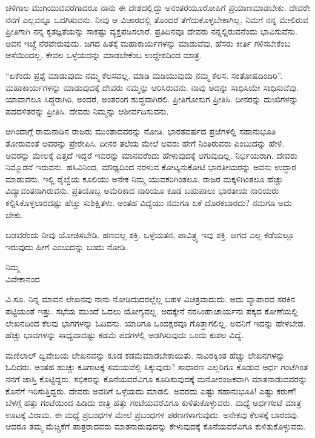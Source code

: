ಚಳಿಗಾಲ ಮುಗಿಯುವವರೆಗಾದರೂ ನಾನು ಈ ದೇಶದಲ್ಲಿದ್ದು ಅನಂತರ\break ಯೂರೋಪಿಗೆ ಪ್ರಯಾಣಮಾಡಬೇಕು. ದೇವರೇ ನನಗೆ ಎಲ್ಲವನ್ನೂ ಒದಗಿಸುವನು. ನೀವು ಆ ವಿಚಾರದಲ್ಲಿ ತೊಂದರೆ ತೆಗೆದುಕೊಳ್ಳಬೇಕಾಗಿಲ್ಲ. ನಿಮಗೆ ನನ್ನ ಮೇಲಿರುವ ಪ್ರೀತಿಗಾಗಿ ನನ್ನ ಕೃತಜ್ಞತೆಯನ್ನು ಸಾಕಷ್ಟು ವ್ಯಕ್ತಪಡಿಸಲಾರೆ. ಪ್ರತಿದಿನವೂ ದೇವರು ನನ್ನಲ್ಲಿರುವನೆಂದು ಭಾವಿಸುವೆನು. ಅವನ ಇಚ್ಚೆ ನೆರವೇರುವುದು. ಜಗದ ಹಿತಕ್ಕೆ ಮಹಾಕಾರ್ಯಗಳನ್ನು ಮಾಡುವೆವು, ಹೆಸರು ಕೀರ್ತಿ ಗಳಿಸಬೇಕೆಂಬ ಆಸೆಯಿಂದಲ್ಲ, ಕೇವಲ ಒಳ್ಳೆಯದನ್ನು ಮಾಡಬೇಕೆಂಬ ಉದ್ದೇಶದಿಂದ ಮಾತ್ರ.

“ಏಕೆಂದು ಪ್ರಶ್ನೆ ಮಾಡುವುದು ನಮ್ಮ ಕೆಲಸವಲ್ಲ. ಮಾಡಿ ಮಡಿಯುವುದು ನಮ್ಮ ಕೆಲಸ. ಸಂತೋಷದಿಂದಿರಿ”. ಮಹಾಕಾರ್ಯಗಳನ್ನು ಮಾಡುವುದಕ್ಕೆ ದೇವರು ನಮ್ಮನ್ನು ಆರಿಸಿರುವನು. ನಾವು ಅದನ್ನು ಸಾಧಿಸಿಯೇ ಸಾಧಿಸುವೆವು. ಯಾವಾಗಲೂ ಸಿದ್ಧರಾಗಿರಿ, ಅಂದರೆ, ಅಂತರಂಗ ಶುದ್ಧವಾಗಿರಲಿ. ಪ್ರೀತಿಗೋಸುಗ ಪ್ರೀತಿಸಿ. ದೀನರನ್ನು ದುಃಖಿಗಳನ್ನು ಪದದಳಿತರನ್ನು ಪ್ರೀತಿಸಿ. ದೇವರು ನಿಮ್ಮನ್ನು ಆಶೀರ್ವದಿಸುವನು.

ಆಗಿಂದಾಗ್ಗೆ ರಾಮನಾಡಿನ ರಾಜರು ಮುಂತಾದವರನ್ನು ನೋಡಿ. ಭಾರತವರ್ಷದ ಪ್ರಜೆಗಳಲ್ಲಿ ಸಹಾನುಭೂತಿ ತೋರುವಂತೆ ಅವರನ್ನು ಪ್ರೇರೇಪಿಸಿ. ದೀನರ ತಲೆಯ ಮೇಲೆ ಅವರು ಹೇಗೆ ನಿಂತಿರುವರು ಎಂಬುದನ್ನು ಹೇಳಿ. ಅವರನ್ನು ಮೇಲಕ್ಕೆ ಎತ್ತದೆ ಇದ್ದರೆ ಇವರನ್ನು ಮಾನವರೆಂದು ಹೇಳುವುದಕ್ಕೆ ಆಗುವುದಿಲ್ಲ. ನಿರ್ಭಯರಾಗಿ. ದೇವರು ನಿಮ್ಮೊಡನೆ ಇರುವನು. ಹಸಿವಿನಿಂದ, ಮೌಢ್ಯದಿಂದ ನರಳುವ ಕೋಟ್ಯನುಕೋಟಿ ಭಾರತೀಯರನ್ನು ಅವನು ಉದ್ಧಾರ ಮಾಡುವನು. ಇಲ್ಲಿ ರೈಲ್ವೆಯ ಕೂಲಿಯು ಅನೇಕ ನಿಮ್ಮ ಯುವಕರಿಗಿಂತಲೂ, ರಾಜರ ಮಕ್ಕಳಿಗಿಂತಲೂ ಹೆಚ್ಚು ವಿದ್ಯಾವಂತನಾಗಿರುವನು. ಪ್ರತಿಯೊಬ್ಬ ಅಮೆರಿಕಾದ ನಾರಿಯೂ ಕೂಡ ಬಹುಪಾಲು ಭಾರತೀಯ ನಾರಿಯರು ಕಲ್ಪಿಸಿಕೊಳ್ಳಲಾರದಷ್ಟು ಹೆಚ್ಚು ಸುಶಿಕ್ಷಿತಳು. ಅಂತಹ ವಿದ್ಯೆಯು ನಮಗೂ ಏಕೆ ದೊರಕಬಾರದು? ನಮಗೂ ಅದು ಬೇಕು.

ಬಡವರೆಂದು ನೀವು ಯೋಚಿಸಬೇಡಿ. ಹಣವಲ್ಲ ಶಕ್ತಿ. ಒಳ್ಳೆಯತನ, ಪಾವಿತ್ರ್ಯ ಇವು ಶಕ್ತಿ. ಜಗದ ಎಲ್ಲ ಕಡೆಯಲ್ಲೂ ಇರುವುದು ಹೀಗೆ ಎಂಬುದನ್ನು ಬಂದು ನೋಡಿ.

\vspace{-0.5cm}

{\flushright
ನಿಮ್ಮ\\ವಿವೇಕಾನಂದ\par}

ವಿ.ಸೂ. \enginline{-}ನಿನ್ನ ಮಾವನ ಲೇಖನವು ನಾನು ನೋಡಿದುದರಲ್ಲೆಲ್ಲ ಬಹಳ ವಿಚಿತ್ರ\break ವಾದುದು. ಅದು ವ್ಯಾಪಾರದ ಸರಕಿನ ಪಟ್ಟಿಯಂತೆ ಇತ್ತು. ಸಭೆಯ ಮುಂದೆ ಓದಲು ಯೋಗ್ಯವಲ್ಲ. ಅದಕ್ಕೇನೆ ನರಸಿಂಹಾಚಾರ್ಯನು ಪಕ್ಕದ ಕೋಣೆಯಲ್ಲಿ ಲೇಖನದಿಂದ ಕೆಲವು ಭಾಗಗಳನ್ನು ಓದಿದನು. ಯಾರಿಗೂ ಒಂದಕ್ಷರವೂ ಗೊತ್ತಾಗಲಿಲ್ಲ. ಅವನಿಗೆ ಇದನ್ನು ಹೇಳಬೇಡ. ಹೆಚ್ಚು ಭಾವಗಳನ್ನು ಸಾಧ್ಯವಾದಷ್ಟು ಕಡಮೆ ಪದಗಳಲ್ಲಿ ಅಡಗಿಸುವುದು ಒಂದು ಕುಶಲ ವಿದ್ಯೆ.

ಮಣಿಲಾಲ್ ದ್ವಿವೇದಿಯ ಲೇಖನವನ್ನು ಕೂಡ ಕಡಮೆಮಾಡಬೇಕಾಯಿತು. ಸಾವಿರ\break ಕ್ಕಿಂತ ಹೆಚ್ಚು ಲೇಖನಗಳನ್ನು ಓದಿದರು. ಅಂತಹ ಹುಚ್ಚು ಕೂಗಾಟಕ್ಕೆ ಸಮಯವೆಲ್ಲಿ ಸಿಕ್ಕುವುದು? ಸಾಧಾರಣ ಎಲ್ಲರಿಗೂ ಕೊಡುವ ಅರ್ಧ ಗಂಟೆಗಿಂತ ನನಗೆ ಜಾಸ್ತಿ ಕೊಟ್ಟಿದ್ದರು. ಸಭಿಕರನ್ನು ಕೊನೆಯವರೆವಿಗೂ ಕೂಡಿಸುವುದಕ್ಕೆ ಮನೋರಂಜಕವಾಗಿ ಮಾತನಾಡುವವರನ್ನು ಕೊನೆಗೆ ಇರಿಸುತ್ತಿದ್ದರು. ದೇವರು ಅವರಿಗೆ ಒಳ್ಳೆಯದು ಮಾಡಲಿ. ಅವರದು ಎಷ್ಟು ಸಹಾನುಭೂತಿ! ಎಷ್ಟು ಕರುಣೆ! ಬೆಳಗ್ಗೆ ಹತ್ತು ಗಂಟೆಯಿಂದ ಹಿಡಿದು ರಾತ್ರಿ ಹತ್ತು ಗಂಟೆಯವರೆವಿಗೂ ಕುಳಿತುಕೊಳ್ಳುವರು. ಮಧ್ಯೆ ಅರ್ಧಗಂಟೆ ಮಾತ್ರ ಊಟಕ್ಕೆ ವಿರಾಮ. ಈ ಮಧ್ಯೆ ಪ್ರಬಂಧಗಳ ಮೇಲೆ ಪ್ರಬಂಧಗಳ ಪಠಣಗಳಾಗುವುದು. ಅನೇಕವು ಕೆಲಸಕ್ಕೆ ಬಾರದವು. ಆದರೂ ತಮ್ಮ ಮೆಚ್ಚಿಕೆಗೆ ಪಾತ್ರರಾದವರು ಮಾತನಾಡುವುದನ್ನು ಕೇಳುವುದಕ್ಕೆ ಕೊನೆಯವರೆವಿಗೂ ಕುಳಿತುಕೊಳ್ಳುವರು.

